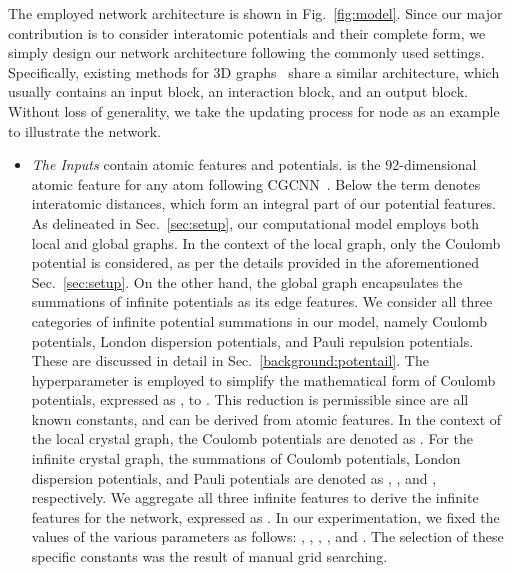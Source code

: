 \documentclass[nohyperref]{article}
\theoremstyle{plain}
\theoremstyle{definition}
\theoremstyle{remark}
\begin{document}
The employed network architecture is shown in Fig.~\ref{fig:model}. Since our major contribution is to consider interatomic potentials and their complete form, we simply design our network architecture following the commonly used settings. Specifically, existing methods for 3D graphs~\citep{xie2018crystal,schutt2017schnet,klicpera2020directional,klicpera2020fast,gasteiger2021gemnet,schutt2021equivariant, wang2022comenet, liu2022spherical, yan2022periodic, wang2023learning} share a similar architecture, which usually contains an input block, an interaction block, and an output block. Without loss of generality, we take the updating process for node  as an example to illustrate the network. 
\begin{itemize}

\item \textit{The Inputs} contain atomic features and potentials.
 is the 92-dimensional atomic feature for any atom  following CGCNN~\citep{xie2018crystal}. Below the term  denotes interatomic distances, which form an integral part of our potential features. As delineated in Sec.~\ref{sec:setup}, our computational model employs both local and global graphs. In the context of the local graph, only the Coulomb potential is considered, as per the details provided in the aforementioned Sec.~\ref{sec:setup}. On the other hand, the global graph encapsulates the summations of infinite potentials as its edge features. We consider all three categories of infinite potential summations in our model, namely Coulomb potentials, London dispersion potentials, and Pauli repulsion potentials. These are discussed in detail in Sec.~\ref{background:potentail}. The hyperparameter  is employed to simplify the mathematical form of Coulomb potentials, expressed as , to . This reduction is permissible since  are all known constants, and  can be derived from atomic features. In the context of the local crystal graph, the Coulomb potentials are denoted as . For the infinite crystal graph, the summations of Coulomb potentials, London dispersion potentials, and Pauli potentials are denoted as , , and , respectively. We aggregate all three infinite features to derive the infinite features for the network, expressed as . In our experimentation, we fixed the values of the various parameters as follows: , , , , and . The selection of these specific constants was the result of manual grid searching.


\end{itemize}
\end{document}
